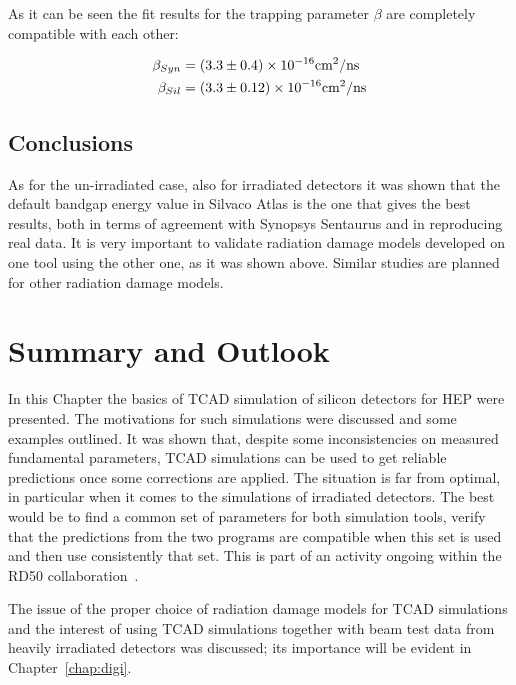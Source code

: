 As it can be seen the fit results for the trapping parameter $\beta$ are completely compatible with 
each other:

\begin{align}
\beta_{Syn}  &  = (3.3 \pm 0.4) \times 10^{-16} {\rm cm}^2/{\rm ns} \nonumber\\
\beta_{Sil}  & = (3.3 \pm 0.12) \times 10^{-16} {\rm cm}^2/{\rm ns} \nonumber\\
\end{align}

\subsection{Conclusions}
As for the un-irradiated case, also for irradiated detectors it was shown that the default bandgap energy 
value in Silvaco Atlas is the one that gives the best results, both in terms of agreement with Synopsys 
Sentaurus and in reproducing real data. It is very important to validate radiation damage models 
developed on one tool using the other one, as it was shown above. 
Similar studies are planned for other radiation damage 
models. 

\section{Summary and Outlook}
\label{sec:TCADSummary}

In this Chapter the basics of TCAD simulation of silicon detectors for HEP were presented. 
The motivations for such simulations were discussed and some examples outlined. 
It was shown that, despite some inconsistencies on measured fundamental parameters, TCAD 
simulations can be used to get reliable predictions once some  corrections are applied. 
The situation is far from optimal, in particular when it comes to the simulations of irradiated 
detectors. The best would be to find a common set of parameters for both simulation tools, 
verify that the predictions from the two programs are compatible when this set is used and then 
use consistently  that set. This is part of an activity ongoing within the RD50 collaboration~\cite{RD50}.

The issue of the proper choice of radiation damage models for TCAD simulations 
and the interest of using TCAD simulations together with beam test data from heavily irradiated detectors 
was discussed; its importance will be evident  in Chapter~\ref{chap:digi}. 



